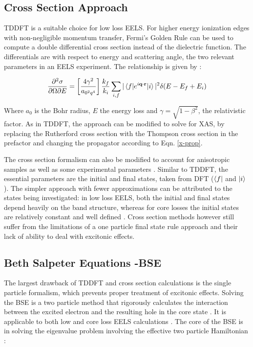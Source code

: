\subsection{Cross Section Approach}
TDDFT is a suitable choice for low loss EELS.  For higher energy ionization edges with non-negligible momentum transfer, Fermi's Golden Rule can be used to compute a double differential cross section instead of the dielectric function.  The differentials are with respect to energy and scattering angle, the two relevant parameters in an EELS experiment.  The relationship is given by \cite{hebert_practical_2007}:

\begin{equation}
		\frac{\partial^2 \sigma}{\partial \Omega \partial E} = \left[\frac{4\gamma^2}{a_{\mathrm{0}^2q^4}}\right] \frac{k_f}{k_i} \sum_{i,f}|\mel{f}{e^{i\textbf{q}\cdot\textbf{r}}}{i}|^2\delta(E-E_f+E_i)
		\label{telnes_eq}
\end{equation}

Where $a_0$ is the Bohr radius, $E$ the energy loss and $\gamma = \sqrt{1- \beta^2}$, the relativistic factor.  As in TDDFT, the approach can be modified to solve for XAS, by replacing the Rutherford cross section with the Thompson cross section in the prefactor and changing the propagator according to Eqn. \ref{x-prop}.



The cross section formalism can also be modified to account for anisotropic samples as well as some experimental parameters \cite{hebert_practical_2007}. Similar to TDDFT, the essential parameters are the initial and final states, taken from DFT ($\bra{f}$ and $\ket{i}$).  The simpler approach with fewer approximations can be attributed to the states being investigated: in low loss EELS, both the initial and final states depend heavily on the band structure, whereas for core losses the initial states are relatively constant and well defined \cite{hebert_practical_2007}.  Cross section methods however still suffer from the limitations of a one particle final state rule approach and their lack of ability to deal with excitonic effects.  

\subsection{Beth Salpeter Equations -BSE}

The largest drawback of TDDFT and cross section calculations is the single particle formalism, which prevents proper treatment of excitonic effects. Solving the BSE is a two particle method that rigorously calculates the  interaction between the excited electron and the resulting hole in the core state \cite{salpeter_relativistic_1951}.  It is applicable to both low and core loss EELS calculations \cite{exciting}.  The core of the BSE is in solving the eigenvalue problem involving the effective two particle Hamiltonian \cite{draxl_bse_2009}: 


